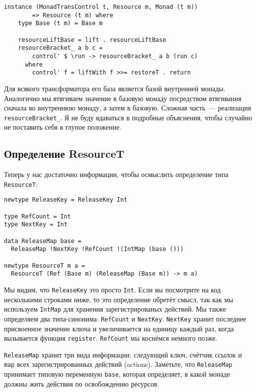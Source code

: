 \begin{lstlisting}
instance (MonadTransControl t, Resource m, Monad (t m))
        => Resource (t m) where
    type Base (t m) = Base m

    resourceLiftBase = lift . resourceLiftBase
    resourceBracket_ a b c =
        control' $ \run -> resourceBracket_ a b (run c)
      where
        control' f = liftWith f >>= restoreT . return
\end{lstlisting}

Для всякого трансформатора его база является базой внутренней монады. Аналогично мы втягиваем значение в базовую монаду посредством втягивания сначала во внутреннюю монаду, а затем в базовую.
Сложная часть~--- реализация \lstinline=resourceBracket_=. Я не буду вдаваться в подробные
объяснения, чтобы случайно не поставить себя в глупое положение.

\subsection{Определение ResourceT}

Теперь у нас достаточно информации, чтобы осмыслить определение типа
\lstinline'ResourceT':
\begin{lstlisting}
newtype ReleaseKey = ReleaseKey Int

type RefCount = Int
type NextKey = Int

data ReleaseMap base =
  ReleaseMap !NextKey !RefCount !(IntMap (base ()))

newtype ResourceT m a =
  ResourceT (Ref (Base m) (ReleaseMap (Base m)) -> m a)
\end{lstlisting}

Мы видим, что \lstinline'ReleaseKey' это просто \lstinline'Int'. Если вы посмотрите на код
несколькими строками ниже, то
это определение обретёт смысл, так как мы используем \lstinline'IntMap' для хранения
зарегистрированых действий. Мы также определяем два типа-синонима: \lstinline'RefCount' и
\lstinline'NextKey'. \lstinline'NextKey'
хранит последнее присвоенное значение ключа и увеличивается на единицу каждый раз, когда
вызывается функция \lstinline!register!. \lstinline{RefCount} мы коснёмся немного позже.

\lstinline'ReleaseMap' хранит три вида информации: следующий ключ, счётчик ссылок и
\lstinline'map' всех
зарегистрированных действий (actions). Заметьте, что \lstinline'ReleaseMap' принимает
типовую переменную \lstinline'base', которая определяет, в какой монаде должны жить действия по освобождению ресурсов.

